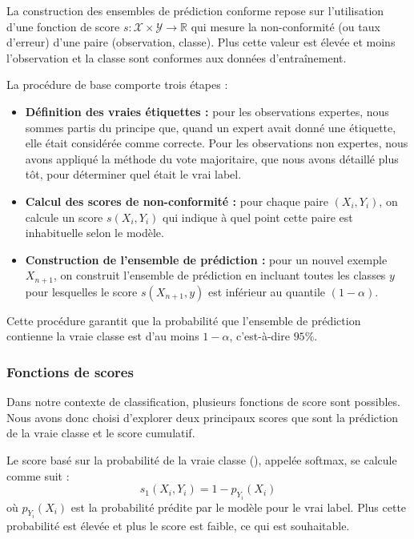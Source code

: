 \documentclass[a4paper,12pt]{article}
\begin{document}
La construction des ensembles de prédiction conforme repose sur l'utilisation d'une fonction de score $s : \mathcal{X} \times \mathcal{Y} \rightarrow \mathbb{R}$ qui mesure la non-conformité (ou taux d'erreur) d'une paire (observation, classe). Plus cette valeur est élevée et moins l'observation et la classe sont conformes aux données d'entraînement.

\vspace{0.2cm}

La procédure de base comporte trois étapes : 
\begin{itemize}
    \item \textbf{Définition des vraies étiquettes :} pour les observations expertes, nous sommes partis du principe que, quand un expert avait donné une étiquette, elle était considérée comme correcte. Pour les observations non expertes, nous avons appliqué la méthode du vote majoritaire, que nous avons détaillé plus tôt, pour déterminer quel était le vrai label.
    \item \textbf{Calcul des scores de non-conformité :} pour chaque paire $(X_i, Y_i)$, on calcule un score $s(X_i, Y_i)$ qui indique à quel point cette paire est inhabituelle selon le modèle.
    \item \textbf{Construction de l'ensemble de prédiction :} pour un nouvel exemple $X_{n+1}$, on construit l'ensemble de prédiction en incluant toutes les classes $y$ pour lesquelles le score $s(X_{n+1}, y)$ est inférieur au quantile $(1- \alpha)$.
\end{itemize}

\vspace{0.2cm}

Cette procédure garantit que la probabilité que l'ensemble de prédiction contienne la vraie classe est d'au moins $1- \alpha$, c'est-à-dire $95\%$.

\subsubsection{Fonctions de scores}

Dans notre contexte de classification, plusieurs fonctions de score sont possibles. Nous avons donc choisi d'explorer deux principaux scores que sont la prédiction de la vraie classe et le score cumulatif.

\vspace{0.2cm}

Le score basé sur la probabilité de la vraie classe (\cite{Vovk}), appelée softmax, se calcule comme suit : 
$$ s_1(X_i, Y_i) = 1 - p_{Y_i}(X_i) $$ où $p_{Y_i}(X_i)$ est la probabilité prédite par le modèle pour le vrai label. Plus cette probabilité est élevée et plus le score est faible, ce qui est souhaitable.
\end{document}
